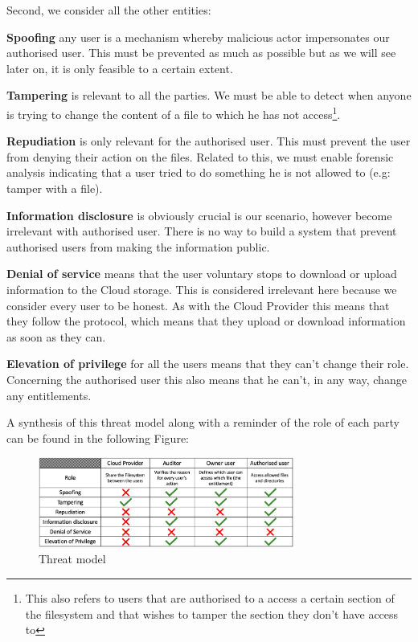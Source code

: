 \documentclass[../main.tex]{subfiles}
\begin{document}
\par Second, we consider all the other entities:
\par \textbf{Spoofing} any user is a mechanism whereby malicious actor impersonates our authorised user. This must be prevented as much as possible but as we will see later on, it is only feasible to a certain extent.
\par \textbf{Tampering} is relevant to all the parties. We must be able to detect when anyone is trying to change the content of a file to which he has not access\footnote{This also refers to users that are authorised to a access a certain section of the filesystem and that wishes to tamper the section they don't have access to}.
\par \textbf{Repudiation} is only relevant for the authorised user. This must prevent the user from denying their action on the files. Related to this, we must enable forensic analysis indicating that a user tried to do something he is not allowed to (e.g: tamper with a file).
\par \textbf{Information disclosure} is obviously crucial is our scenario, however become irrelevant with authorised user. There is no way to build a system that prevent authorised users from making the information public.
\par \textbf{Denial of service} means that the user voluntary stops to download or upload information to the Cloud storage. This is considered irrelevant here because we consider every user to be honest. As with the Cloud Provider this means that they follow the protocol, which means that they upload or download information as soon as they can.
\par \textbf{Elevation of privilege} for all the users means that they can't change their role. Concerning the authorised user this also means that he can't, in any way, change any entitlements.\\

\par A synthesis of this threat model along with a reminder of the role of each party can be found in the following Figure:
\begin{figure}[h]
    \centering
    \includegraphics[width=0.75\textwidth]{images/problem/threat_model}
    
    \caption{Threat model}
    \label{figure:problem:threat_model}
\end{figure}
\end{document}
